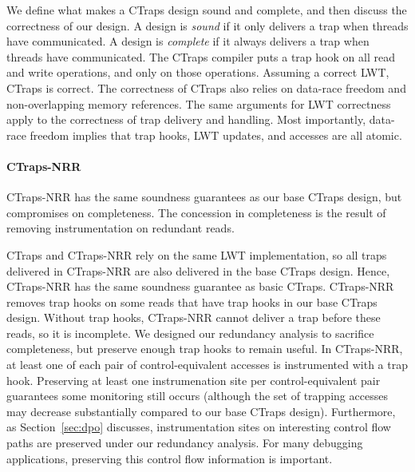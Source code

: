\documentclass[preprint,9pt]{sigplanconf}
\newcommand{\ctraps}{CTraps\xspace}
\newcommand{\ctrapsmm}{CTraps-NRR\xspace}
\newcommand{\lwt}{LWT\xspace}
\begin{document}
We define what makes a \ctraps design sound and complete, and then discuss the
correctness of our design.  A design is {\em sound} if it only delivers a trap
when threads have communicated.  A design is {\em complete} if it always
delivers a trap when threads have communicated.  The \ctraps compiler puts a
trap hook on all read and write operations, and only on those operations.
Assuming a correct \lwt, \ctraps is correct.  The correctness of \ctraps also
relies on data-race freedom and non-overlapping memory references.  The same
arguments for \lwt correctness apply to the correctness of trap delivery and
handling.  Most importantly, data-race freedom implies that trap hooks, \lwt
updates, and accesses are all atomic.



\paragraph{\ctrapsmm} 

\ctrapsmm has the same soundness guarantees as our base \ctraps design, but
compromises on completeness.  The concession in completeness is the result of
removing instrumentation on redundant reads. 

\ctraps and \ctrapsmm rely on the same \lwt implementation, so all traps
delivered in \ctrapsmm are also delivered in the base \ctraps design.  Hence,
\ctrapsmm has the same soundness guarantee as basic \ctraps.  \ctrapsmm removes
trap hooks on some reads that have trap hooks in our base \ctraps design.
Without trap hooks, \ctrapsmm cannot deliver a trap before these reads, so it
is incomplete.  We designed our redundancy analysis to sacrifice completeness,
but preserve enough trap hooks to remain useful.  In \ctrapsmm, at least one of
each pair of control-equivalent accesses is instrumented with a trap hook.
Preserving at least one instrumenation site per control-equivalent pair
guarantees some monitoring still occurs (although the set of trapping accesses
may decrease substantially compared to our base \ctraps design).  Furthermore,
as Section~\ref{sec:dpo} discusses, instrumentation sites on interesting
control flow paths are preserved under our redundancy analysis.  For many
debugging applications, preserving this control flow information is important.
\end{document}
